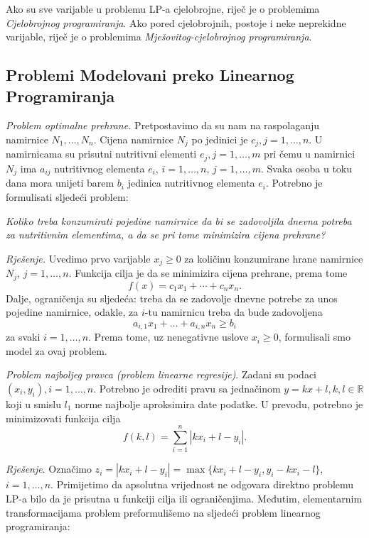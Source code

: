 \documentclass[a4paper, utf8, 11pt, colorlinks]{article}
\begin{document}
Ako su sve varijable u problemu LP-a cjelobrojne, riječ je o problemima \emph{Cjelobrojnog programiranja}. Ako pored cjelobrojnih, postoje i neke neprekidne varijable, riječ je o problemima \emph{Mješovitog-cjelobrojnog programiranja}. 

\subsection{Problemi Modelovani preko Linearnog Programiranja}

\emph{Problem optimalne prehrane.} Pretpostavimo da su nam na raspolaganju namirnice $N_1, \ldots, N_n$. Cijena namirnice $N_j$ po jedinici je $c_j, j = 1, \ldots, n$. U namirnicama su prisutni nutritivni elementi $e_j,j=1,\ldots,m$ pri čemu
u namirnici $N_j$ ima $a_{ij}$ nutritivnog elementa $e_i$, $i = 1, \ldots, n$, $j = 1, \ldots, m$. Svaka osoba u toku dana mora unijeti barem $b_i$
jedinica nutritivnog elementa $e_i$. Potrebno je formulisati
sljedeći problem: 

\emph{Koliko treba konzumirati pojedine namirnice da bi se zadovoljila dnevna
potreba za nutritivnim elementima, a da se pri tome minimizira cijena prehrane?}
 
 \emph{Rješenje.}  Uvedimo prvo varijable $x_j \geq 0$ za količinu konzumirane hrane namirnice $N_j$, $j = 1, \ldots, n$. Funkcija cilja je da se minimizira cijena prehrane, prema tome $$f(x) = c_1 x_1 + \cdots + c_n x_n.$$
 Dalje, ograničenja su sljedeća: treba da se zadovolje dnevne potrebe za unos pojedine namirnice, odakle, za $i$-tu namirnicu treba da bude zadovoljena 
 $$ a_{i,1} x_1 + \ldots + a_{i,n} x_n \geq b_i $$
 za svaki $i=1,\ldots,n$. Prema tome, uz nenegativne uslove $x_i \geq 0$, formulisali smo model za ovaj problem.  
 
\emph{Problem najboljeg pravca (problem linearne regresije)}. Zadani su podaci $(x_i, y_i), i = 1, \ldots , n$. Potrebno je odrediti pravu sa jednačinom $y = k x + l,
k, l \in \mathbb{R}$ koji u smislu $l_1$ norme najbolje aproksimira date podatke. U prevodu, potrebno je minimizovati  funkcija cilja $$f(k, l) = \sum_{i=1}^n |k x_i + l - y_i|.$$

\emph{Rješenje}.
Označimo $z_i = |k x_i + l - y_i| = \max\{k x_i + l - y_i, y_i - k x_i - l \}$, $i=1,\ldots,n$. 
Primijetimo da apsolutna vrijednost ne odgovara direktno problemu LP-a bilo da je prisutna u funkciji cilja ili ograničenjima. Međutim, elementarnim transformacijama problem preformulišemo na sljedeći  problem linearnog programiranja:
\end{document}
